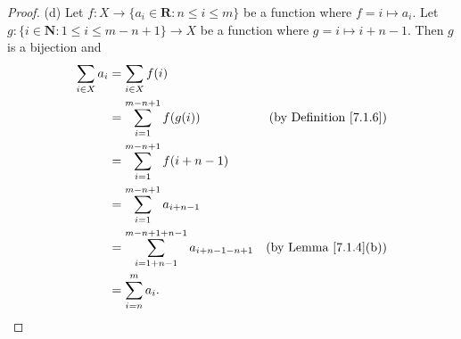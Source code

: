 \begin{proof}{(d)}
    Let \(f : X \to \{a_i \in \mathbf{R} : n \leq i \leq m\}\) be a function where \(f = i \mapsto a_i\).
    Let \(g : \{i \in \mathbf{N} : 1 \leq i \leq m - n + 1\} \to X\) be a function where \(g = i \mapsto i + n - 1\).
    Then \(g\) is a bijection and
    \begin{align*}
        \sum_{i \in X} a_i & = \sum_{i \in X} f(i)                                                                                 \\
                           & = \sum_{i = 1}^{m - n + 1} f(g(i))                               & \text{(by Definition \ref{7.1.6})} \\
                           & = \sum_{i = 1}^{m - n + 1} f(i + n - 1)                                                               \\
                           & = \sum_{i = 1}^{m - n + 1} a_{i + n - 1}                                                              \\
                           & = \sum_{i = 1 + n - 1}^{m - n + 1 + n - 1} a_{i + n - 1 - n + 1} & \text{(by Lemma \ref{7.1.4}(b))}   \\
                           & = \sum_{i = n}^m a_i.
    \end{align*}
\end{proof}

